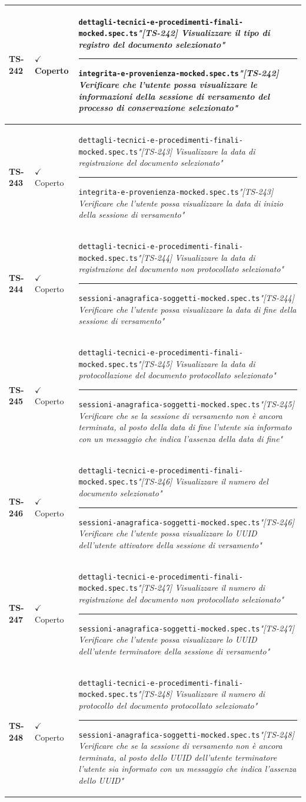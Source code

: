 \documentclass[a4paper,12pt]{article}
\newcommand{\ok}{\textcolor{green!60!black}{$\checkmark$ Coperto}}
\newcommand{\f}[1]{\nolinkurl{#1}\newline}
\newcommand{\q}[1]{\textit{#1}}
\newcommand{\sep}{\newline \vspace{2mm} \hrule \vspace{2mm}}
\begin{document}
\begin{longtable}{|p{1.5cm}|p{3.0cm}|p{10.5cm}|}
\textbf{TS-242} & \ok & \f{dettagli-tecnici-e-procedimenti-finali-mocked.spec.ts}\q{"[TS-242] Visualizzare il tipo di registro del documento selezionato"} \sep \f{integrita-e-provenienza-mocked.spec.ts}\q{"[TS-242] Verificare che l'utente possa visualizzare le informazioni della sessione di versamento del processo di conservazione selezionato"} \\ \hline
\textbf{TS-243} & \ok & \f{dettagli-tecnici-e-procedimenti-finali-mocked.spec.ts}\q{"[TS-243] Visualizzare la data di registrazione del documento selezionato"} \sep \f{integrita-e-provenienza-mocked.spec.ts}\q{"[TS-243] Verificare che l'utente possa visualizzare la data di inizio della sessione di versamento"} \\ \hline
\textbf{TS-244} & \ok & \f{dettagli-tecnici-e-procedimenti-finali-mocked.spec.ts}\q{"[TS-244] Visualizzare la data di registrazione del documento non protocollato selezionato"} \sep \f{sessioni-anagrafica-soggetti-mocked.spec.ts}\q{"[TS-244] Verificare che l'utente possa visualizzare la data di fine della sessione di versamento"} \\ \hline
\textbf{TS-245} & \ok & \f{dettagli-tecnici-e-procedimenti-finali-mocked.spec.ts}\q{"[TS-245] Visualizzare la data di protocollazione del documento protocollato selezionato"} \sep \f{sessioni-anagrafica-soggetti-mocked.spec.ts}\q{"[TS-245] Verificare che se la sessione di versamento non è ancora terminata, al posto della data di fine l'utente sia informato con un messaggio che indica l'assenza della data di fine"} \\ \hline
\textbf{TS-246} & \ok & \f{dettagli-tecnici-e-procedimenti-finali-mocked.spec.ts}\q{"[TS-246] Visualizzare il numero del documento selezionato"} \sep \f{sessioni-anagrafica-soggetti-mocked.spec.ts}\q{"[TS-246] Verificare che l'utente possa visualizzare lo UUID dell'utente attivatore della sessione di versamento"} \\ \hline
\textbf{TS-247} & \ok & \f{dettagli-tecnici-e-procedimenti-finali-mocked.spec.ts}\q{"[TS-247] Visualizzare il numero di registrazione del documento non protocollato selezionato"} \sep \f{sessioni-anagrafica-soggetti-mocked.spec.ts}\q{"[TS-247] Verificare che l'utente possa visualizzare lo UUID dell'utente terminatore della sessione di versamento"} \\ \hline
\textbf{TS-248} & \ok & \f{dettagli-tecnici-e-procedimenti-finali-mocked.spec.ts}\q{"[TS-248] Visualizzare il numero di protocollo del documento protocollato selezionato"} \sep \f{sessioni-anagrafica-soggetti-mocked.spec.ts}\q{"[TS-248] Verificare che se la sessione di versamento non è ancora terminata, al posto dello UUID dell'utente terminatore l'utente sia informato con un messaggio che indica l'assenza dello UUID"} \\ \hline

\end{longtable}
\end{document}
